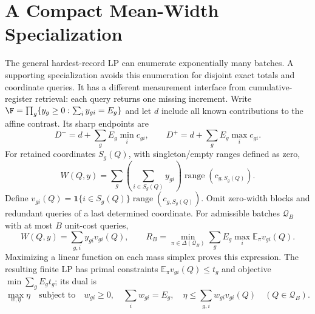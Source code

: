 \section{A Compact Mean-Width Specialization}
\label{sec:structured}\label{sec:randomized-recovery}
The general hardest-record LP can enumerate exponentially many batches.
A supporting specialization avoids this enumeration for disjoint exact
totals and coordinate queries. It has a different measurement interface
from cumulative-register retrieval: each query returns one missing increment.
Write $\F=\prod_g\{y_g\geq0:\sum_i y_{gi}=E_g\}$ and let $d$ include
all known contributions to the affine contrast. Its sharp endpoints are
\begin{equation}
 D^-=d+\sum_gE_g\min_i c_{gi},\qquad
 D^+=d+\sum_gE_g\max_i c_{gi}.\label{eq:sharp}
\end{equation}
For retained coordinates $S_g(Q)$, with singleton/empty ranges defined as zero,
\begin{equation}
 W(Q,y)=\sum_g\left(\sum_{i\in S_g(Q)}y_{gi}\right)
             \operatorname{range}(c_{g,S_g(Q)}).
 \label{eq:querywidth}
\end{equation}
Define $v_{gi}(Q)=\mathbf1\{i\in S_g(Q)\}\operatorname{range}(c_{g,S_g(Q)})$.
Omit zero-width blocks and redundant queries of a last determined coordinate.
For admissible batches $\mathcal Q_B$ with at most $B$ unit-cost queries,
\begin{equation}
 W(Q,y)=\sum_{g,i}y_{gi}v_{gi}(Q),\qquad
 R_B=\min_{\pi\in\Delta(\mathcal Q_B)}\sum_gE_g\max_i\mathbb E_\pi v_{gi}(Q).
 \label{eq:random-objective}
\end{equation}
Maximizing a linear function on each mass simplex proves this expression.
The resulting finite LP has primal constraints
$\mathbb E_\pi v_{gi}(Q)\leq t_g$ and objective $\min\sum_gE_gt_g$;
its dual is
\begin{equation}
 \max_{w,\eta}\eta\quad\text{subject to}\quad
 w_{gi}\geq0,\quad\sum_iw_{gi}=E_g,\quad
 \eta\leq\sum_{g,i}w_{gi}v_{gi}(Q)\quad(Q\in\mathcal Q_B).
 \label{eq:random-dual}
\end{equation}

